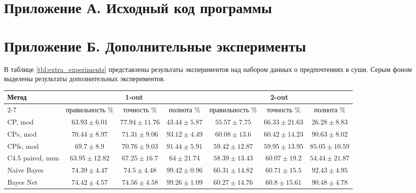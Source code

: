 \appendix
\chapter*{Приложение А. Исходный код программы}

\appendix
\chapter*{Приложение Б. Дополнительные эксперименты}

В таблице \ref{tbl:extra_experiments} представлены результаты экспериментов над набором данных о предпочтениях в суши. Серым фоном выделены результаты дополнительных экспериментов.

\begin{sidewaystable}[ph!]
	\centering
	\begin{tabular}{|l|ccc|ccc|}
		\hline
		\multirow{2}{*}{Метод}   & \multicolumn{3}{c|}{1-out}                             & \multicolumn{3}{c|}{2-out}         \\ \cline{2-7}  
		& правильность \%  & точность \%      & полнота \%       & правильность \%   & точность \%       & полнота \% \rule{0pt}{2.4ex} \\ \hline
		CP, mod    				 & $63.93 \pm 6.01$ & $77.94 \pm 11.76$  & $43.44 \pm 5.87$ & $55.57 \pm 7.75$  & $66.33 \pm 21.63$  & $26.28 \pm 8.83$ \rule{0pt}{2.4ex} \\ 
		CPs, mod				 & $70.44 \pm 8.97$  & $71.31 \pm 9.06$  & $93.12 \pm 4.49$ & $60.08 \pm 13.6$  & $60.42 \pm 14.23$  & $90.63 \pm 8.02$ \\
		CPfs, mod				 & $69.7 \pm 8.9$ & $70.76 \pm 9.03$ & $91.44 \pm 5.91$  & $59.42 \pm 12.87$   & $59.95 \pm 13.95$  & $85.05 \pm 10.59$ \\
		C4.5 paired, num 	     & $63.95 \pm 12.82$ & $67.25 \pm 16.7$ & $64 \pm 21.74$ & $58.39 \pm 13.43$  & $60.07 \pm 19.2$ & $54.44 \pm 21.87$ \\
		\rowcolor{lightgray} 
		Naive Bayes  			 & $74.39 \pm 4.47$  & $74.5 \pm 4.48$ & $99.42 \pm 0.96$  & $60.31 \pm 14.82$  & $60.71 \pm 15.5$   & $92.43 \pm 4.95$ \\ 
		\rowcolor{lightgray} 
		Bayes Net  				 & $74.42 \pm 4.57$  & $74.56 \pm 4.58$ & $99.26 \pm 1.09$ & $60.27 \pm  14.76$ & $60.8 \pm 15.61$ & $90.48 \pm 4.78$ \\ 
		\hline
	\end{tabular}
	\label{tbl:extra_experiments}
\end{sidewaystable}